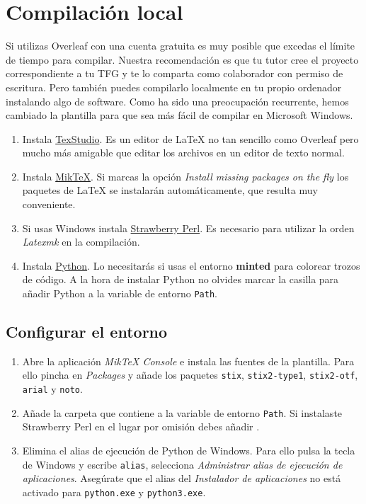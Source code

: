 \section{Compilación local} 
\label{sec:local}

Si utilizas Overleaf con una cuenta gratuita es muy posible que excedas el límite de tiempo para compilar. Nuestra recomendación es que tu tutor cree el proyecto correspondiente a tu TFG y te lo comparta como colaborador con permiso de escritura.  Pero también puedes compilarlo localmente en tu propio ordenador instalando algo de software. Como ha sido una preocupación recurrente, hemos cambiado la plantilla para que sea más fácil de compilar en Microsoft Windows.

\begin{enumerate}
\item Instala \href{https://www.texstudio.org/}{TexStudio}. Es un editor de \LaTeX{} no tan sencillo como Overleaf pero mucho más amigable que editar los archivos en un editor de texto normal.
\item Instala \href{https://miktex.org/download}{MikTeX}. Si marcas la opción \emph{Install missing packages on the fly} los paquetes de \LaTeX{} se instalarán automáticamente, que resulta muy conveniente.
\item Si usas Windows instala \href{https://strawberryperl.com/}{Strawberry Perl}. Es necesario para utilizar la orden \emph{Latexmk} en la compilación.
\item Instala \href{https://python.org}{Python}. Lo necesitarás si usas el entorno \textbf{minted} para colorear trozos de código. A la hora de instalar Python no olvides marcar la casilla para añadir Python a la variable de entorno \texttt{Path}.
\end{enumerate}

\subsection{Configurar el entorno}

\begin{enumerate}
\item Abre la aplicación \emph{MikTeX Console} e instala las fuentes de la plantilla. Para ello pincha en \emph{Packages} y añade los paquetes \texttt{stix}, \texttt{stix2-type1}, \texttt{stix2-otf}, \texttt{arial} y \texttt{noto}.
\item Añade la carpeta que contiene  a la variable de entorno \texttt{Path}.  Si instalaste Strawberry Perl en el lugar por omisión debes añadir .
\item Elimina el alias de ejecución de Python de Windows.  Para ello pulsa la tecla de Windows y escribe \texttt{alias}, selecciona \emph{Administrar alias de ejecución de aplicaciones}. Asegúrate que el alias del \emph{Instalador de aplicaciones} no está activado para \texttt{python.exe} y \texttt{python3.exe}.
\end{enumerate}

